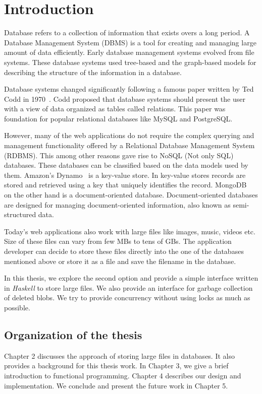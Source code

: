 \chapter{Introduction}
\label{chap:intro}

Database refers to a collection of information that exists overs a long period.
A Database Management System (DBMS) is a tool for creating and managing large amount of data efficiently.
Early database management systems evolved from file systems. These database systems used tree-based and the graph-based models for describing the structure of the information in a database.

Database systems changed significantly following a famous paper written by Ted Codd in 1970~\cite{codd1970relational}. Codd proposed that database systems should present the user with a view of data organized as tables called relations. This paper was foundation for popular relational databases like MySQL and PostgreSQL.

However, many of the web applications do not require the complex querying and management functionality offered by a Relational Database Management System (RDBMS). This among other reasons gave rise to NoSQL (Not only SQL) databases. These databases can be classified based on the data models used by them. Amazon's Dynamo~\cite{decandia2007dynamo} is a key-value store. In key-value stores records are stored and retrieved using a key that uniquely identifies the record.
MongoDB~\cite{chodorow2013mongodb} on the other hand is a document-oriented database. Document-oriented databases are designed for managing document-oriented information, also known as semi-structured data.

Today's web applications also work with large files like images, music, videos etc. Size of these files can vary from few MBs to tens of GBs. The application developer can decide to store these files directly into the one of the databases mentioned above or store it as a file and save the filename in the database.

In this thesis, we explore the second option and provide a simple interface written in \textit{Haskell} to store large files. We also provide an interface for garbage collection of deleted blobs. We try to provide concurrency without using locks as much as possible.

\section{Organization of the thesis}
Chapter 2 discusses the approach of storing large files in databases. It also provides a background for this thesis work. In Chapter 3, we give a brief introduction to functional programming. Chapter 4 describes our design and implementation. We conclude and present the future work in Chapter 5.
